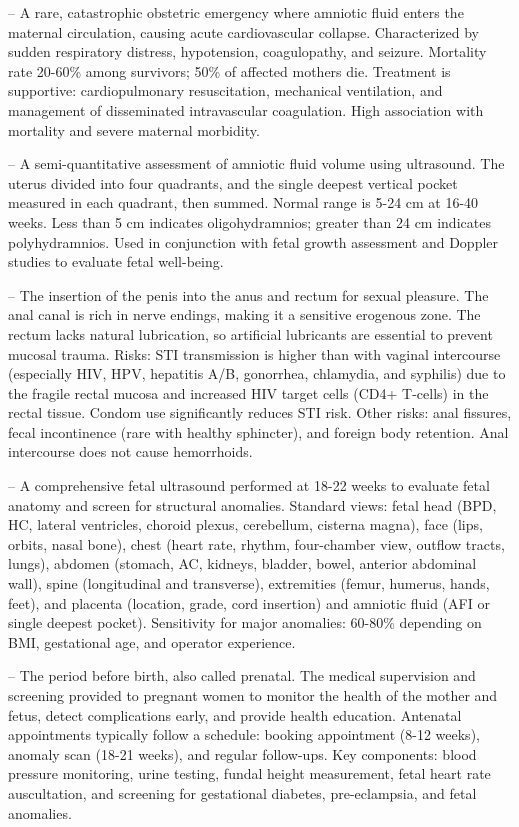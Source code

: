 -- A rare, catastrophic obstetric emergency where amniotic fluid enters the maternal circulation, causing acute cardiovascular collapse. Characterized by sudden respiratory distress, hypotension, coagulopathy, and seizure. Mortality rate 20-60\% among survivors; 50\% of affected mothers die. Treatment is supportive: cardiopulmonary resuscitation, mechanical ventilation, and management of disseminated intravascular coagulation. High association with mortality and severe maternal morbidity.

-- A semi-quantitative assessment of amniotic fluid volume using ultrasound. The uterus divided into four quadrants, and the single deepest vertical pocket measured in each quadrant, then summed. Normal range is 5-24 cm at 16-40 weeks. Less than 5 cm indicates oligohydramnios; greater than 24 cm indicates polyhydramnios. Used in conjunction with fetal growth assessment and Doppler studies to evaluate fetal well-being.

-- The insertion of the penis into the anus and rectum for sexual pleasure. The anal canal is rich in nerve endings, making it a sensitive erogenous zone. The rectum lacks natural lubrication, so artificial lubricants are essential to prevent mucosal trauma. Risks: STI transmission is higher than with vaginal intercourse (especially HIV, HPV, hepatitis A/B, gonorrhea, chlamydia, and syphilis) due to the fragile rectal mucosa and increased HIV target cells (CD4+ T-cells) in the rectal tissue. Condom use significantly reduces STI risk. Other risks: anal fissures, fecal incontinence (rare with healthy sphincter), and foreign body retention. Anal intercourse does not cause hemorrhoids.

-- A comprehensive fetal ultrasound performed at 18-22 weeks to evaluate fetal anatomy and screen for structural anomalies. Standard views: fetal head (BPD, HC, lateral ventricles, choroid plexus, cerebellum, cisterna magna), face (lips, orbits, nasal bone), chest (heart rate, rhythm, four-chamber view, outflow tracts, lungs), abdomen (stomach, AC, kidneys, bladder, bowel, anterior abdominal wall), spine (longitudinal and transverse), extremities (femur, humerus, hands, feet), and placenta (location, grade, cord insertion) and amniotic fluid (AFI or single deepest pocket). Sensitivity for major anomalies: 60-80\% depending on BMI, gestational age, and operator experience.

-- The period before birth, also called prenatal. The medical supervision and screening provided to pregnant women to monitor the health of the mother and fetus, detect complications early, and provide health education. Antenatal appointments typically follow a schedule: booking appointment (8-12 weeks), anomaly scan (18-21 weeks), and regular follow-ups. Key components: blood pressure monitoring, urine testing, fundal height measurement, fetal heart rate auscultation, and screening for gestational diabetes, pre-eclampsia, and fetal anomalies.

